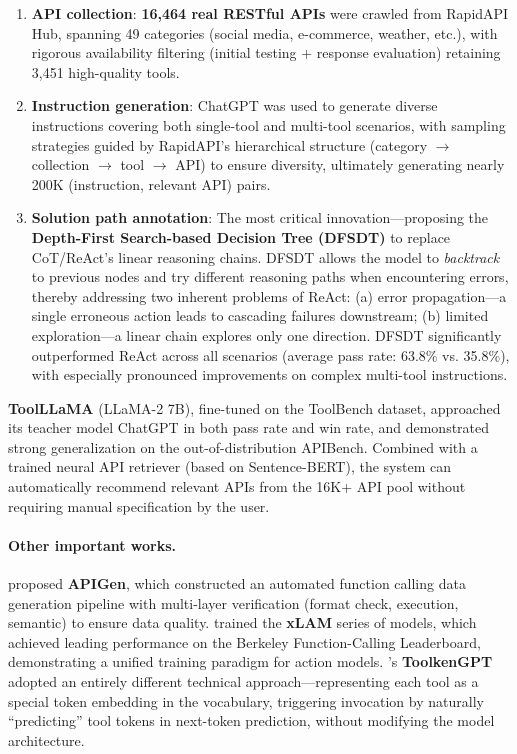 \begin{enumerate}[leftmargin=*]
  \item \textbf{API collection}: \textbf{16,464 real RESTful APIs} were crawled from RapidAPI Hub, spanning 49 categories (social media, e-commerce, weather, etc.), with rigorous availability filtering (initial testing + response evaluation) retaining 3,451 high-quality tools.
  \item \textbf{Instruction generation}: ChatGPT was used to generate diverse instructions covering both single-tool and multi-tool scenarios, with sampling strategies guided by RapidAPI's hierarchical structure (category $\rightarrow$ collection $\rightarrow$ tool $\rightarrow$ API) to ensure diversity, ultimately generating nearly 200K (instruction, relevant API) pairs.
  \item \textbf{Solution path annotation}: The most critical innovation---proposing the \textbf{Depth-First Search-based Decision Tree (DFSDT)} to replace CoT/ReAct's linear reasoning chains. DFSDT allows the model to \emph{backtrack} to previous nodes and try different reasoning paths when encountering errors, thereby addressing two inherent problems of ReAct: (a) error propagation---a single erroneous action leads to cascading failures downstream; (b) limited exploration---a linear chain explores only one direction. DFSDT significantly outperformed ReAct across all scenarios (average pass rate: 63.8\% vs. 35.8\%), with especially pronounced improvements on complex multi-tool instructions.
\end{enumerate}

\textbf{ToolLLaMA} (LLaMA-2 7B), fine-tuned on the ToolBench dataset, approached its teacher model ChatGPT in both pass rate and win rate, and demonstrated strong generalization on the out-of-distribution APIBench. Combined with a trained neural API retriever (based on Sentence-BERT), the system can automatically recommend relevant APIs from the 16K+ API pool without requiring manual specification by the user.

\paragraph{Other important works.}
\citet{liu2024apigen} proposed \textbf{APIGen}, which constructed an automated function calling data generation pipeline with multi-layer verification (format check, execution, semantic) to ensure data quality.
\citet{zhang2024xlam} trained the \textbf{xLAM} series of models, which achieved leading performance on the Berkeley Function-Calling Leaderboard, demonstrating a unified training paradigm for action models.
\citet{hao2023toolkengpt}'s \textbf{ToolkenGPT} adopted an entirely different technical approach---representing each tool as a special token embedding in the vocabulary, triggering invocation by naturally ``predicting'' tool tokens in next-token prediction, without modifying the model architecture.


